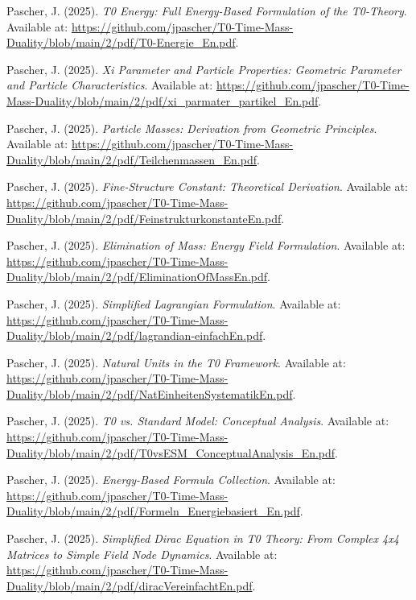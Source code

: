 \documentclass[12pt,a4paper]{article}
\numberwithin{equation}{section}
\begin{document}
	\begin{thebibliography}{99}
		
		Pascher, J. (2025). \emph{T0 Energy: Full Energy-Based Formulation of the T0-Theory}. Available at: \url{https://github.com/jpascher/T0-Time-Mass-Duality/blob/main/2/pdf/T0-Energie_En.pdf}.
		
		Pascher, J. (2025). \emph{Xi Parameter and Particle Properties: Geometric Parameter and Particle Characteristics}. Available at: \url{https://github.com/jpascher/T0-Time-Mass-Duality/blob/main/2/pdf/xi_parmater_partikel_En.pdf}.
		
		Pascher, J. (2025). \emph{Particle Masses: Derivation from Geometric Principles}. Available at: \url{https://github.com/jpascher/T0-Time-Mass-Duality/blob/main/2/pdf/Teilchenmassen_En.pdf}.
		
		Pascher, J. (2025). \emph{Fine-Structure Constant: Theoretical Derivation}. Available at: \url{https://github.com/jpascher/T0-Time-Mass-Duality/blob/main/2/pdf/FeinstrukturkonstanteEn.pdf}.
		
		Pascher, J. (2025). \emph{Elimination of Mass: Energy Field Formulation}. Available at: \url{https://github.com/jpascher/T0-Time-Mass-Duality/blob/main/2/pdf/EliminationOfMassEn.pdf}.
		
		Pascher, J. (2025). \emph{Simplified Lagrangian Formulation}. Available at: \url{https://github.com/jpascher/T0-Time-Mass-Duality/blob/main/2/pdf/lagrandian-einfachEn.pdf}.
		
		Pascher, J. (2025). \emph{Natural Units in the T0 Framework}. Available at: \url{https://github.com/jpascher/T0-Time-Mass-Duality/blob/main/2/pdf/NatEinheitenSystematikEn.pdf}.
		
		Pascher, J. (2025). \emph{T0 vs. Standard Model: Conceptual Analysis}. Available at: \url{https://github.com/jpascher/T0-Time-Mass-Duality/blob/main/2/pdf/T0vsESM_ConceptualAnalysis_En.pdf}.
		
		Pascher, J. (2025). \emph{Energy-Based Formula Collection}. Available at: \url{https://github.com/jpascher/T0-Time-Mass-Duality/blob/main/2/pdf/Formeln_Energiebasiert_En.pdf}.
		
		Pascher, J. (2025). \emph{Simplified Dirac Equation in T0 Theory: From Complex 4x4 Matrices to Simple Field Node Dynamics}. Available at: \url{https://github.com/jpascher/T0-Time-Mass-Duality/blob/main/2/pdf/diracVereinfachtEn.pdf}.
		

\end{thebibliography}
\end{document}
